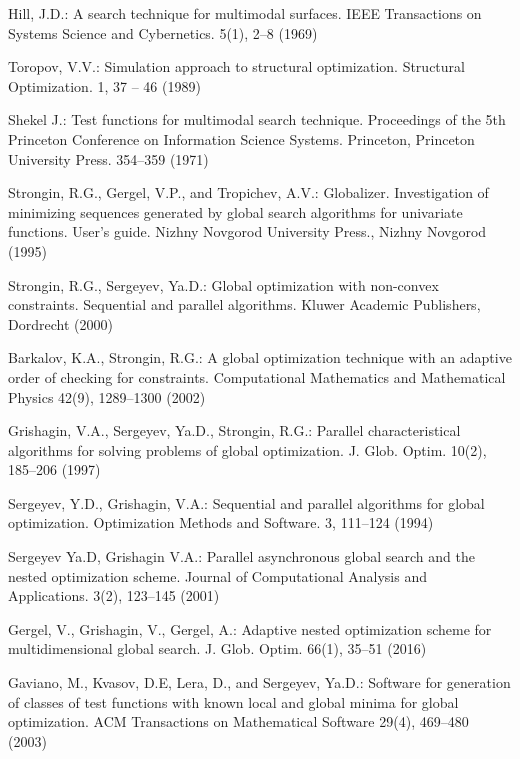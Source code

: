 \documentclass{llncs}
\begin{document}
\begin{thebibliography}{99}

Hill, J.D.: A search technique for multimodal surfaces. IEEE Transactions on Systems Science and Cybernetics. 5(1), 2--8 (1969)

Toropov, V.V.: Simulation approach to structural optimization. Structural Optimization. 1, 37 -- 46 (1989)

Shekel J.: Test functions for multimodal search technique. Proceedings of the 5th Princeton Conference on Information Science Systems. Princeton, Princeton University Press. 354--359 (1971)

Strongin, R.G., Gergel, V.P., and Tropichev, A.V.: Globalizer. Investigation of minimizing sequences generated by global search algorithms for univariate functions. User's guide. Nizhny Novgorod University Press., Nizhny Novgorod (1995)

Strongin, R.G., Sergeyev, Ya.D.: Global optimization with non-convex constraints. Sequential and parallel algorithms. Kluwer Academic Publishers, Dordrecht (2000)

Barkalov, K.A., Strongin, R.G.: A global optimization technique with an adaptive order of checking for constraints. Computational Mathematics and Mathematical Physics 42(9), 1289--1300 (2002)

Grishagin, V.A., Sergeyev, Ya.D., Strongin, R.G.: Parallel characteristical algorithms for solving problems of global optimization. J. Glob. Optim. 10(2), 185--206 (1997)

Sergeyev, Y.D., Grishagin, V.A.: Sequential and parallel algorithms for global optimization. Optimization Methods and Software. 3, 111--124 (1994)

Sergeyev Ya.D, Grishagin V.A.: Parallel asynchronous global search and the nested optimization scheme. Journal of Computational Analysis and Applications. 3(2), 123--145 (2001)

Gergel, V., Grishagin, V., Gergel, A.: Adaptive nested optimization scheme for multidimensional global search. J. Glob. Optim. 66(1), 35--51 (2016)

Gaviano, M., Kvasov, D.E, Lera, D., and Sergeyev, Ya.D.: Software for generation of classes of test functions with known local and global minima for global optimization. ACM Transactions on Mathematical Software 29(4), 469--480 (2003)


\end{thebibliography}
\end{document}
